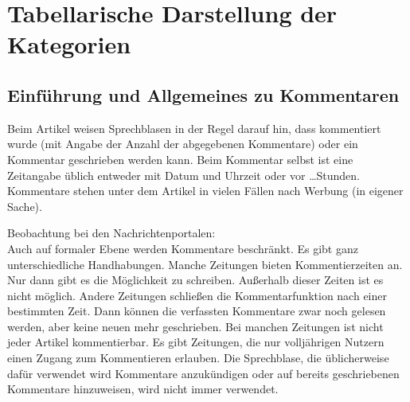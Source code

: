 \chapter{Tabellarische Darstellung der Kategorien}

\section{Einführung und Allgemeines zu Kommentaren}

Beim Artikel weisen Sprechblasen in der Regel darauf hin, dass kommentiert wurde
(mit Angabe der Anzahl der abgegebenen Kommentare) oder ein Kommentar
geschrieben werden kann.  Beim Kommentar selbst ist eine Zeitangabe üblich
entweder mit Datum und Uhrzeit oder \glqq vor \ldots Stunden\grqq.  Kommentare
stehen unter dem Artikel in vielen Fällen nach Werbung (in eigener Sache).

Beobachtung bei den Nachrichtenportalen:\\
Auch auf formaler Ebene werden Kommentare beschränkt. Es gibt ganz
unterschiedliche Handhabungen. Manche Zeitungen bieten Kommentierzeiten an. Nur
dann gibt es die Möglichkeit zu schreiben. Außerhalb dieser Zeiten ist es nicht
möglich. Andere Zeitungen schließen die Kommentarfunktion nach einer bestimmten
Zeit. Dann können die verfassten Kommentare zwar noch gelesen werden, aber keine
neuen mehr geschrieben. Bei manchen Zeitungen ist nicht jeder Artikel
kommentierbar. Es gibt Zeitungen, die nur volljährigen Nutzern einen Zugang zum
Kommentieren erlauben.  Die Sprechblase, die üblicherweise dafür verwendet wird
Kommentare anzukündigen oder auf bereits geschriebenen Kommentare hinzuweisen,
wird nicht immer verwendet.

